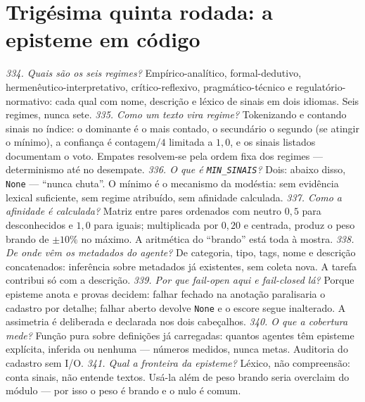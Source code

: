 \section{Trigésima quinta rodada: a episteme em código}
\textit{334. Quais são os seis regimes?} Empírico-analítico, formal-dedutivo, hermenêutico-interpretativo, crítico-reflexivo, pragmático-técnico e regulatório-normativo: cada qual com nome, descrição e léxico de sinais em dois idiomas. Seis regimes, nunca sete.
\textit{335. Como um texto vira regime?} Tokenizando e contando sinais no índice: o dominante é o mais contado, o secundário o segundo (se atingir o mínimo), a confiança é contagem$/4$ limitada a $1{,}0$, e os sinais listados documentam o voto. Empates resolvem-se pela ordem fixa dos regimes --- determinismo até no desempate.
\textit{336. O que é \texttt{MIN\_SINAIS}?} Dois: abaixo disso, \texttt{None} --- ``nunca chuta''. O mínimo é o mecanismo da modéstia: sem evidência lexical suficiente, sem regime atribuído, sem afinidade calculada.
\textit{337. Como a afinidade é calculada?} Matriz entre pares ordenados com neutro $0{,}5$ para desconhecidos e $1{,}0$ para iguais; multiplicada por $0{,}20$ e centrada, produz o peso brando de $\pm10\%$ no máximo. A aritmética do ``brando'' está toda à mostra.
\textit{338. De onde vêm os metadados do agente?} De categoria, tipo, tags, nome e descrição concatenados: inferência sobre metadados já existentes, sem coleta nova. A tarefa contribui só com a descrição.
\textit{339. Por que fail-open aqui e fail-closed lá?} Porque episteme anota e provas decidem: falhar fechado na anotação paralisaria o cadastro por detalhe; falhar aberto devolve \texttt{None} e o escore segue inalterado. A assimetria é deliberada e declarada nos dois cabeçalhos.
\textit{340. O que a cobertura mede?} Função pura sobre definições já carregadas: quantos agentes têm episteme explícita, inferida ou nenhuma --- números medidos, nunca metas. Auditoria do cadastro sem I/O.
\textit{341. Qual a fronteira da episteme?} Léxico, não compreensão: conta sinais, não entende textos. Usá-la além de peso brando seria overclaim do módulo --- por isso o peso é brando e o nulo é comum.
